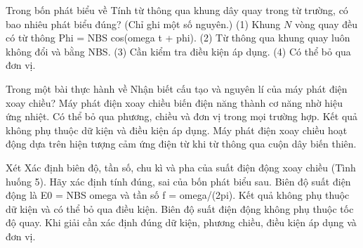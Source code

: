 \begin{ex}
Trong bốn phát biểu về Tính từ thông qua khung dây quay trong từ trường, có bao nhiêu phát biểu đúng? (Chỉ ghi một số nguyên.) (1) Khung $N$ vòng quay đều có từ thông Phi = NBS cos(omega t + phi). (2) Từ thông qua khung quay luôn không đổi và bằng NBS. (3) Cần kiểm tra điều kiện áp dụng. (4) Có thể bỏ qua đơn vị.
\end{ex}

\begin{ex}
Trong một bài thực hành về Nhận biết cấu tạo và nguyên lí của máy phát điện xoay chiều?
\choice
{Máy phát điện xoay chiều biến điện năng thành cơ năng nhờ hiệu ứng nhiệt.}
{Có thể bỏ qua phương, chiều và đơn vị trong mọi trường hợp.}
{Kết quả không phụ thuộc dữ kiện và điều kiện áp dụng.}
{\True Máy phát điện xoay chiều hoạt động dựa trên hiện tượng cảm ứng điện từ khi từ thông qua cuộn dây biến thiên.}
\end{ex}

\begin{ex}
Xét Xác định biên độ, tần số, chu kì và pha của suất điện động xoay chiều (Tình huống 5). Hãy xác định tính đúng, sai của bốn phát biểu sau.
\choiceTF
{\True Biên độ suất điện động là E0 = NBS omega và tần số f = omega/(2pi).}
{Kết quả không phụ thuộc dữ kiện và có thể bỏ qua điều kiện.}
{Biên độ suất điện động không phụ thuộc tốc độ quay.}
{\True Khi giải cần xác định đúng dữ kiện, phương chiều, điều kiện áp dụng và đơn vị.}
\end{ex}

